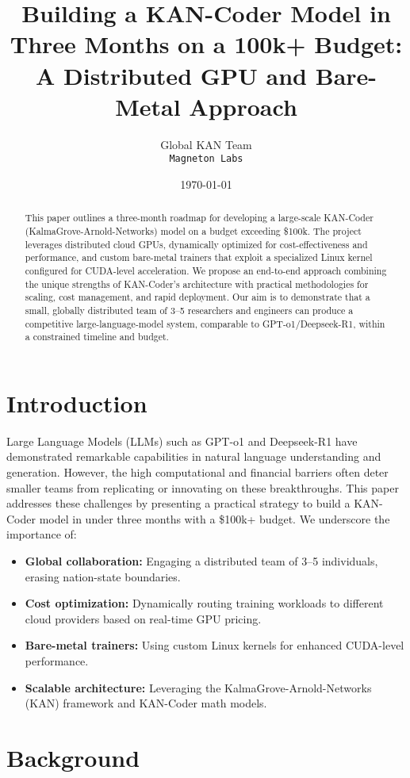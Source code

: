 \documentclass{article}
\title{Building a KAN-Coder Model in Three Months on a 100k+ Budget: \\
A Distributed GPU and Bare-Metal Approach}
\author{
  Global KAN Team \\
  \texttt{Magneton Labs}
}
\date{\today}
\begin{document}
\maketitle

\begin{abstract}
This paper outlines a three-month roadmap for developing a large-scale KAN-Coder (KalmaGrove-Arnold-Networks) model on a budget exceeding \$100k. The project leverages distributed cloud GPUs, dynamically optimized for cost-effectiveness and performance, and custom bare-metal trainers that exploit a specialized Linux kernel configured for CUDA-level acceleration. We propose an end-to-end approach combining the unique strengths of KAN-Coder's architecture with practical methodologies for scaling, cost management, and rapid deployment. Our aim is to demonstrate that a small, globally distributed team of 3--5 researchers and engineers can produce a competitive large-language-model system, comparable to GPT-o1/Deepseek-R1, within a constrained timeline and budget.
\end{abstract}

\section{Introduction}
Large Language Models (LLMs) such as GPT-o1 and Deepseek-R1 have demonstrated remarkable capabilities in natural language understanding and generation. However, the high computational and financial barriers often deter smaller teams from replicating or innovating on these breakthroughs. This paper addresses these challenges by presenting a practical strategy to build a KAN-Coder model in under three months with a \$100k+ budget. We underscore the importance of:
\begin{itemize}
    \item \textbf{Global collaboration:} Engaging a distributed team of 3--5 individuals, erasing nation-state boundaries.
    \item \textbf{Cost optimization:} Dynamically routing training workloads to different cloud providers based on real-time GPU pricing.
    \item \textbf{Bare-metal trainers:} Using custom Linux kernels for enhanced CUDA-level performance.
    \item \textbf{Scalable architecture:} Leveraging the KalmaGrove-Arnold-Networks (KAN) framework and KAN-Coder math models.
\end{itemize}

\section{Background}
\end{document}

